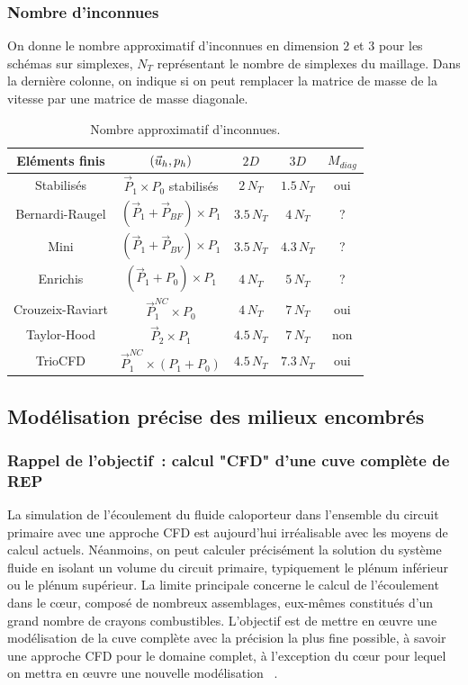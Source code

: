 \subsubsection{Nombre d'inconnues} 
On donne le nombre approximatif d'inconnues en dimension $2$ et $3$ pour les sch\'emas sur simplexes, $N_T$ repr\'esentant le nombre de simplexes du maillage. Dans la derni\`ere colonne, on indique si on peut remplacer la matrice de masse de la vitesse par une matrice de masse diagonale.
\begin{table}[!h]
\begin{center}
\begin{tabular}{c|c|c|c|c}
El\'ements finis& $(\velocity_h,p_h)$ & $2D$ & $3D$ & $M_{diag}$\\
\hline
Stabilis\'es &$\vec{P}_1\times P_0$ stabilis\'es    & $2\,N_T$   & $1.5\,N_T$ &  oui \\
Bernardi-Raugel&$(\vec{P}_1+\vec{P}_{BF})\times P_1$& $3.5\,N_T$ & $4\,N_T$   &  ?   \\
Mini&$(\vec{P}_1+\vec{P}_{BV})\times P_1$& $3.5\,N_T$ & $4.3\,N_T$ &  ?   \\
Enrichis&$(\vec{P}_1+P_0)\times P_1$& $4\,N_T$   & $5\,N_T$   &  ?   \\
Crouzeix-Raviart&$\vec{P}_1^{NC}\times P_0$& $4\,N_T$   & $7\,N_T$   & oui  \\
Taylor-Hood&$\vec{P}_2\times P_1$& $4.5\,N_T$ & $7\,N_T$   & non  \\
TrioCFD&$\vec{P}_1^{NC}\times (P_1+P_0)$& $4.5\,N_T$ & $7.3\,N_T$ & oui
\end{tabular}
\caption{Nombre approximatif d'inconnues.}\label{tab:Ninc}
\end{center}
\end{table}




\subsection{Mod\'elisation pr\'ecise des milieux encombr\'es}
\label{section-poreux}
\subsubsection{Rappel de l'objectif~: calcul "CFD" d'une cuve compl\`ete de REP}
La simulation de l'\'ecoulement du fluide caloporteur dans l'ensemble du circuit primaire avec une approche CFD est aujourd'hui irr\'ealisable avec les moyens de calcul actuels. N\'eanmoins, on peut calculer pr\'ecis\'ement la solution du syst\`eme fluide en isolant un volume du circuit primaire, typiquement le pl\'enum inf\'erieur ou le pl\'enum sup\'erieur. La limite principale concerne le calcul de l'\'ecoulement dans le c{\oe}ur, compos\'e de nombreux assemblages, eux-m\^emes constitu\'es d'un grand nombre de crayons combustibles. 
L'objectif est de mettre en {\oe}uvre une mod\'elisation de la cuve compl\`ete avec la pr\'ecision la plus fine possible, \`a savoir une approche CFD pour le domaine complet, \`a l'exception du c{\oe}ur pour lequel on mettra en {\oe}uvre une nouvelle mod\'elisation ~\cite{FdR_Trio}.  

